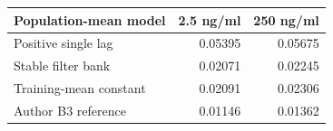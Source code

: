 \begin{tabular}{lrr}
\toprule
Population-mean model & 2.5 ng/ml & 250 ng/ml \\
\midrule
Positive single lag & 0.05395 & 0.05675 \\
Stable filter bank & 0.02071 & 0.02245 \\
Training-mean constant & 0.02091 & 0.02306 \\
Author B3 reference & 0.01146 & 0.01362 \\
\bottomrule
\end{tabular}
